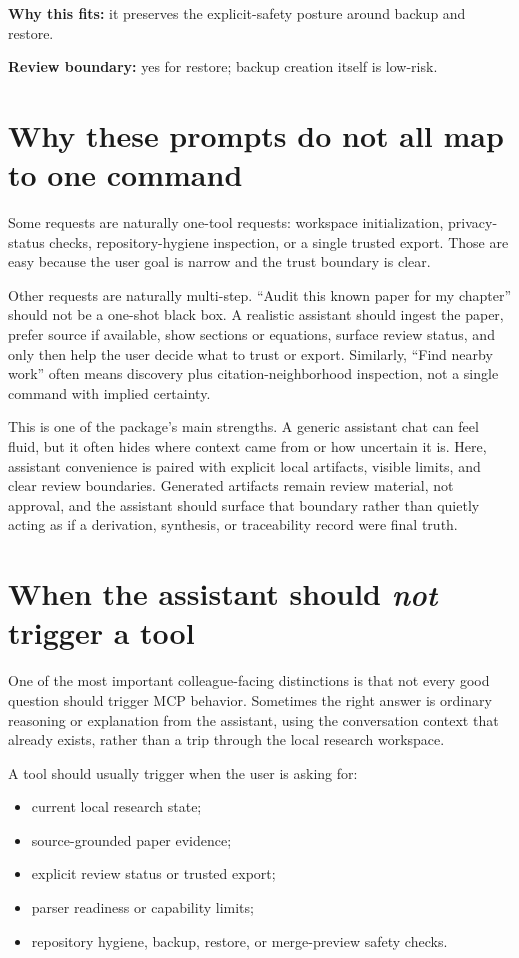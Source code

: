 \documentclass[11pt,a4paper,openany]{book}
\begin{document}
\textbf{Why this fits:} it preserves the explicit-safety posture around backup
and restore.

\textbf{Review boundary:} yes for restore; backup creation itself is low-risk.

\section{Why these prompts do not all map to one command}

Some requests are naturally one-tool requests: workspace initialization,
privacy-status checks, repository-hygiene inspection, or a single trusted export.
Those are easy because the user goal is narrow and the trust boundary is clear.

Other requests are naturally multi-step. ``Audit this known paper for my chapter''
should not be a one-shot black box. A realistic assistant should ingest the
paper, prefer source if available, show sections or equations, surface review
status, and only then help the user decide what to trust or export. Similarly,
``Find nearby work'' often means discovery plus citation-neighborhood inspection,
not a single command with implied certainty.

This is one of the package's main strengths. A generic assistant chat can feel
fluid, but it often hides where context came from or how uncertain it is. Here,
assistant convenience is paired with explicit local artifacts, visible limits,
and clear review boundaries. Generated artifacts remain review material, not
approval, and the assistant should surface that boundary rather than quietly
acting as if a derivation, synthesis, or traceability record were final truth.

\section{When the assistant should \emph{not} trigger a tool}

One of the most important colleague-facing distinctions is that not every good
question should trigger MCP behavior. Sometimes the right answer is ordinary
reasoning or explanation from the assistant, using the conversation context that
already exists, rather than a trip through the local research workspace.

A tool should usually trigger when the user is asking for:
\begin{itemize}[nosep]
  \item current local research state;
  \item source-grounded paper evidence;
  \item explicit review status or trusted export;
  \item parser readiness or capability limits;
  \item repository hygiene, backup, restore, or merge-preview safety checks.
\end{itemize}
\end{document}

